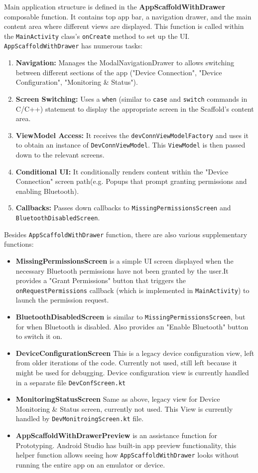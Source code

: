 Main application structure is defined in the \textbf{AppScaffoldWithDrawer} composable function. It contains top app bar, a navigation drawer, and the main content area where different views are displayed. This function is called within the \texttt{MainActivity} class's \texttt{onCreate} method to set up the UI.
\texttt{AppScaffoldWithDrawer} has numerous tasks:
\begin{enumerate}
	\item \textbf{Navigation:} Manages the ModalNavigationDrawer to allows switching between different sections of the app ("Device Connection", "Device Configuration", "Monitoring \& Status").
	\item \textbf{Screen Switching:} Uses a \texttt{when} (similar to \texttt{case} and \texttt{switch} commands in C/C++) statement to display the appropriate screen in the Scaffold's content area.
	\item \textbf{ViewModel Access:} It receives the \texttt{devConnViewModelFactory} and uses it to obtain an instance of \texttt{DevConnViewModel}. This \texttt{ViewModel} is then passed down to the relevant screens.
	\item \textbf{Conditional UI:} It conditionally renders content within the "Device Connection" screen path(e.g. Popups that prompt granting permissions and enabling Bluetooth).
	\item \textbf{Callbacks:} Passes down callbacks to \texttt{MissingPermissionsScreen} and \\ \texttt{BluetoothDisabledScreen}.
\end{enumerate}
Besides \texttt{AppScaffoldWithDrawer} function, there are also various supplementary functions:
\begin{itemize}
	\item \textbf{MissingPermissionsScreen} is a simple UI screen displayed when the necessary Bluetooth permissions have not been granted by the user.It provides a "Grant Permissions" button that triggers the \texttt{onRequestPermissions} callback (which is implemented in \texttt{MainActivity}) to launch the permission request.
	\item \textbf{BluetoothDisabledScreen} is similar to \texttt{MissingPermissionsScreen}, but for when Bluetooth is disabled. Also provides an "Enable Bluetooth" button to switch it on.
	\item \textbf{DeviceConfigurationScreen} This is a legacy device configuration view, left from older iterations of the code. Currently not used, still left because it might be used for debugging. Device configuration view is currently handled in a separate file \texttt{DevConfScreen.kt}
	\item \textbf{MonitoringStatusScreen} Same as above, legacy view for Device Monitoring \& Status screen, currently not used. This View is currently handled by \texttt{DevMonitroingScreen.kt} file.
	\item \textbf{AppScaffoldWithDrawerPreview} is an assistance function for Prototyping. Android Studio has built-in app preview functionality, this helper function allows seeing how \texttt{AppScaffoldWithDrawer} looks without running the entire app on an emulator or device.
\end{itemize}
